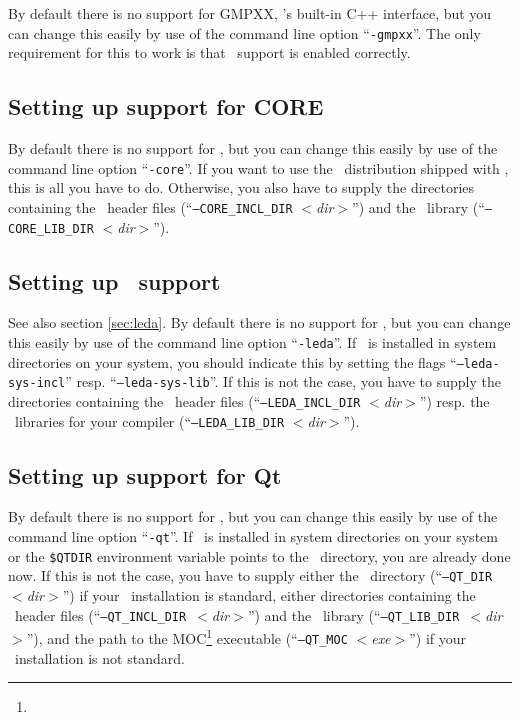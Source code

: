 By default there is no support for GMPXX, \gmp's built-in C++
interface, but you can change this easily by use of the command line
option ``\texttt{-gmpxx}''.  The only requirement for this to work is
that \gmp\ support is enabled correctly.

\subsection{Setting up support for CORE}\label{sec:core-setup}

By default there is no support for \core, but you can change this
easily by use of the command line option ``\texttt{-core}''. If you
want to use the \core\ distribution shipped with \cgal, this is all
you have to do. Otherwise, you also have to supply the directories
containing the \core\ header files (``\texttt{--CORE\_INCL\_DIR}
\textit{$<$dir$>$}'') and the \core\ library
(``\texttt{--CORE\_LIB\_DIR}
\textit{$<$dir$>$}'').

\subsection{Setting up \leda\ support}\label{sec:leda-setup}

See also section \ref{sec:leda}. By default there is no support for
\leda, but you can change this easily by use of the command line
option ``\texttt{-leda}''. If \leda\ is installed in system
directories on your system, you should indicate this by setting the
flags ``{\tt --leda-sys-incl}'' resp.  ``\texttt{--leda-sys-lib}''. If
this is not the case, you have to supply the directories containing
the \leda\ header files (``\texttt{--LEDA\_INCL\_DIR}
\textit{$<$dir$>$}'') resp. the \leda\ 
libraries for your compiler (``\texttt{--LEDA\_LIB\_DIR} {\it
  $<$dir$>$}'').

\subsection{Setting up support for Qt}\label{sec:qt-setup}

By default there is no support for \qt, but you can change this easily
by use of the command line option ``\texttt{-qt}''. If \qt\ is
installed in system directories on your system or the \texttt{\$QTDIR}
environment variable points to the \qt\ directory, you are already
done now. If this is not the case, you have to supply either the \qt\ 
directory (``\texttt{--QT\_DIR}~\textit{$<$dir$>$}'')
if your \qt\ installation is standard, either directories containing
the \qt\ header files
(``\texttt{--QT\_INCL\_DIR}~\textit{$<$dir$>$}'')
and the \qt\ library
(``\texttt{--QT\_LIB\_DIR}~\textit{$<$dir$>$}'')\TTindex{QT\_LIB\_DIR},
and the path to the MOC\footnote{\qtmocpage} executable
(``\texttt{--QT\_MOC} \textit{$<$exe$>$}'')\TTindex{QT\_MOC} if your
\qt\ installation is not standard.

